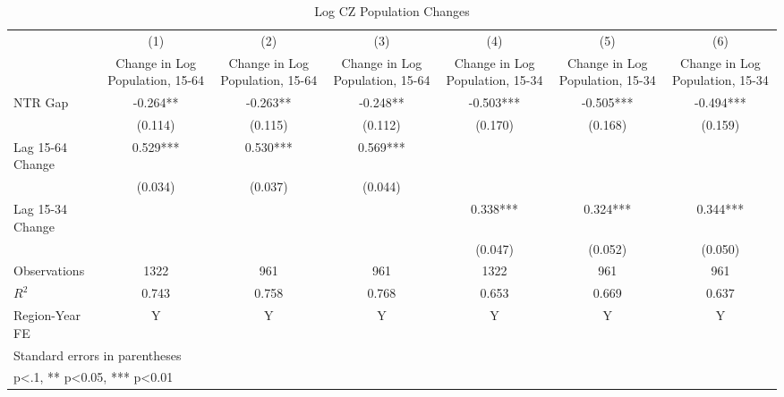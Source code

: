 \begin{table}[htbp]\centering
\def\sym#1{\ifmmode^{#1}\else\(^{#1}\)\fi}
\caption{Log CZ Population Changes}
\begin{tabular}{l*{6}{c}}
\toprule
                    &\multicolumn{1}{c}{(1)}&\multicolumn{1}{c}{(2)}&\multicolumn{1}{c}{(3)}&\multicolumn{1}{c}{(4)}&\multicolumn{1}{c}{(5)}&\multicolumn{1}{c}{(6)}\\
                    &\multicolumn{1}{c}{Change in Log Population, 15-64}&\multicolumn{1}{c}{Change in Log Population, 15-64}&\multicolumn{1}{c}{Change in Log Population, 15-64}&\multicolumn{1}{c}{Change in Log Population, 15-34}&\multicolumn{1}{c}{Change in Log Population, 15-34}&\multicolumn{1}{c}{Change in Log Population, 15-34}\\
\midrule
NTR Gap             &   -0.264** &   -0.263** &   -0.248** &   -0.503***&   -0.505***&   -0.494***\\
                    &  (0.114)   &  (0.115)   &  (0.112)   &  (0.170)   &  (0.168)   &  (0.159)   \\
\addlinespace
Lag 15-64 Change    &    0.529***&    0.530***&    0.569***&            &            &            \\
                    &  (0.034)   &  (0.037)   &  (0.044)   &            &            &            \\
\addlinespace
Lag 15-34 Change    &            &            &            &    0.338***&    0.324***&    0.344***\\
                    &            &            &            &  (0.047)   &  (0.052)   &  (0.050)   \\
\midrule
Observations        &     1322   &      961   &      961   &     1322   &      961   &      961   \\
\(R^{2}\)           &    0.743   &    0.758   &    0.768   &    0.653   &    0.669   &    0.637   \\
Region-Year FE      &        Y   &        Y   &        Y   &        Y   &        Y   &        Y   \\
\bottomrule
\multicolumn{7}{l}{\footnotesize Standard errors in parentheses}\\
\multicolumn{7}{l}{\footnotesize * p<.1, ** p<0.05, *** p<0.01}\\
\end{tabular}
\end{table}
